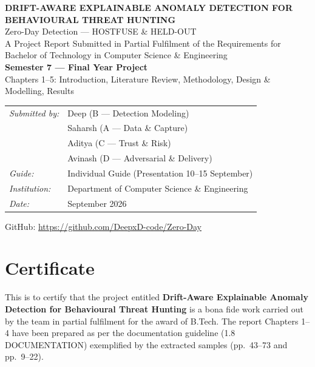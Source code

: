 \documentclass[12pt,a4paper,oneside]{report}
\begin{document}
\begin{titlepage}
\centering
\vspace*{1.2cm}
{\Large\bfseries DRIFT-AWARE EXPLAINABLE ANOMALY DETECTION FOR BEHAVIOURAL THREAT HUNTING}\\[0.4cm]
{\large Zero-Day Detection — HOSTFUSE \& HELD-OUT}\\[1.2cm]
{\large A Project Report Submitted in Partial Fulfilment of the Requirements for}\\[0.2cm]
{\large Bachelor of Technology in Computer Science \& Engineering}\\[1.6cm]
{\large\textbf{Semester 7 — Final Year Project}}\\[0.6cm]
{\large Chapters 1–5: Introduction, Literature Review, Methodology, Design \& Modelling, Results}\\[1.6cm]
\begin{tabular}{ll}
\textit{Submitted by:} & Deep (B — Detection Modeling)\\
& Saharsh (A — Data \& Capture)\\
& Aditya (C — Trust \& Risk)\\
& Avinash (D — Adversarial \& Delivery)\\[0.4cm]
\textit{Guide:} & Individual Guide (Presentation 10–15 September)\\[0.2cm]
\textit{Institution:} & Department of Computer Science \& Engineering\\[0.2cm]
\textit{Date:} & September 2026\\
\end{tabular}
\vfill
{\small GitHub: \url{https://github.com/DeepxD-code/Zero-Day}}\\
\end{titlepage}

\chapter*{Certificate}
This is to certify that the project entitled \textbf{Drift-Aware Explainable Anomaly Detection for Behavioural Threat Hunting} is a bona fide work carried out by the team in partial fulfilment for the award of B.Tech. The report Chapters 1–4 have been prepared as per the documentation guideline (1.8 DOCUMENTATION) exemplified by the extracted samples (pp.~43--73 and pp.~9--22).
\end{document}
